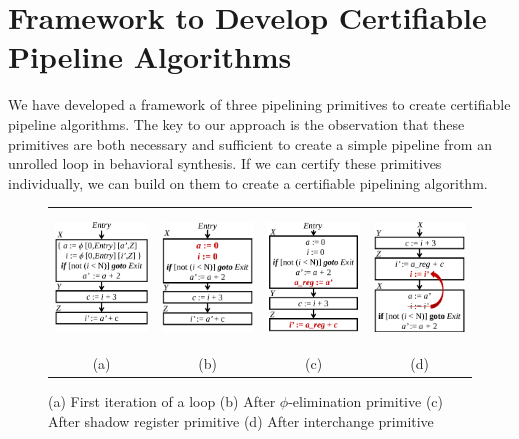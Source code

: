 \section{Framework to Develop Certifiable Pipeline Algorithms}
\label{sec:fundamental-tasks}

We have developed a framework of three pipelining primitives to create certifiable pipeline algorithms. The key to our approach is the observation that these primitives are 
both necessary and sufficient to create a simple pipeline from an unrolled loop in behavioral synthesis. If we can certify these primitives individually, we can build on them to create a certifiable pipelining algorithm.

\begin{figure}[t!]
\begin{center}
\begin{tabular}{cccc}
\includegraphics[height=1.4in]{fig-rpe/one-iteration-of-loop}
&
\includegraphics[height=1.4in]{fig-rpe/phi-removal-transformation}
&
\includegraphics[height=1.4in]{fig-rpe/shadow-register-transformation}
&
\includegraphics[height=1.4in]{fig-rpe/interchange-transformation}
\\
(a) & (b) & (c) & (d)
\end{tabular}
\end{center}
\caption{(a) First iteration of a loop (b) After $\phi$-elimination primitive (c) After shadow register primitive (d) After interchange primitive}
\label{fig:fundamental-steps}
\end{figure}


